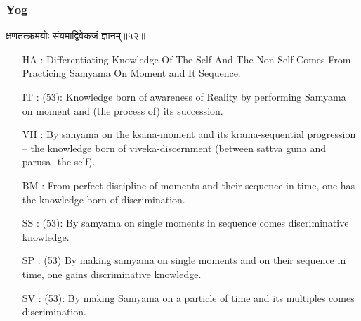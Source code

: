 \begin{frame}[fragile]\frametitle{Yog}
\begin{sanskrit}
क्षणतत्क्रमयोः संयमाद्विवेकजं ज्ञानम्॥५२॥
\end{sanskrit}

	\begin{itemize}
	\item [HA]: Differentiating Knowledge Of The Self And The Non-Self Comes From Practicing Samyama On Moment and It Sequence.
	\item [IT]: (53): Knowledge born of awareness of Reality by performing Samyama on moment and (the process of) its succession.
	\item [VH]: By sanyama on the ksana-moment and its krama-sequential progression – the knowledge born of viveka-discernment (between sattva guna and parusa- the self).
	\item [BM]: From perfect discipline of moments and their sequence in time, one has the knowledge born of discrimination.
	\item [SS]: (53): By samyama on single moments in sequence comes discriminative knowledge.
	\item [SP]: (53) By making samyama on single moments and on their sequence in time, one gains discriminative knowledge.
	\item [SV]: (53): By making Samyama on a particle of time and its multiples comes discrimination. 
	\end{itemize}
\end{frame}


